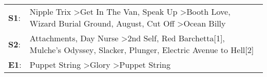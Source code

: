 \begin{supertabular}{p{0.03\textwidth}p{0.92\textwidth}}
 \textbf{S1}:  &  Nipple Trix\textsuperscript{} \textgreater \enspace Get In The Van\textsuperscript{}, \enspace Speak Up\textsuperscript{} \textgreater \enspace Booth Love\textsuperscript{}, \enspace Wizard Burial Ground\textsuperscript{}, \enspace August\textsuperscript{}, \enspace Cut Off\textsuperscript{} \textgreater \enspace Ocean Billy\textsuperscript{}  \enspace  \\
 \textbf{S2}:  &             Attachments\textsuperscript{}, \enspace Day Nurse\textsuperscript{} \textgreater \enspace 2nd Self\textsuperscript{}, \enspace Red Barchetta[1]\textsuperscript{}, \enspace Mulche's Odyssey\textsuperscript{}, \enspace Slacker\textsuperscript{}, \enspace Plunger\textsuperscript{}, \enspace Electric Avenue to Hell[2]\textsuperscript{}  \enspace  \\
 \textbf{E1}:  &                                                                                                                                                                                                                       Puppet String\textsuperscript{} \textgreater \enspace Glory\textsuperscript{} \textgreater \enspace Puppet String\textsuperscript{}  \enspace  \\
\end{supertabular}
